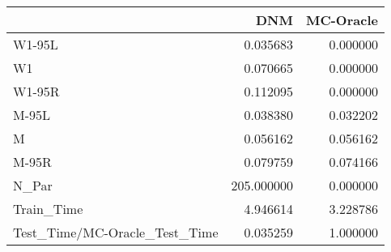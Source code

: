 \begin{tabular}{lrr}
\toprule
{} &         DNM &  MC-Oracle \\
\midrule
W1-95L                        &    0.035683 &   0.000000 \\
W1                            &    0.070665 &   0.000000 \\
W1-95R                        &    0.112095 &   0.000000 \\
M-95L                         &    0.038380 &   0.032202 \\
M                             &    0.056162 &   0.056162 \\
M-95R                         &    0.079759 &   0.074166 \\
N\_Par                         &  205.000000 &   0.000000 \\
Train\_Time                    &    4.946614 &   3.228786 \\
Test\_Time/MC-Oracle\_Test\_Time &    0.035259 &   1.000000 \\
\bottomrule
\end{tabular}
